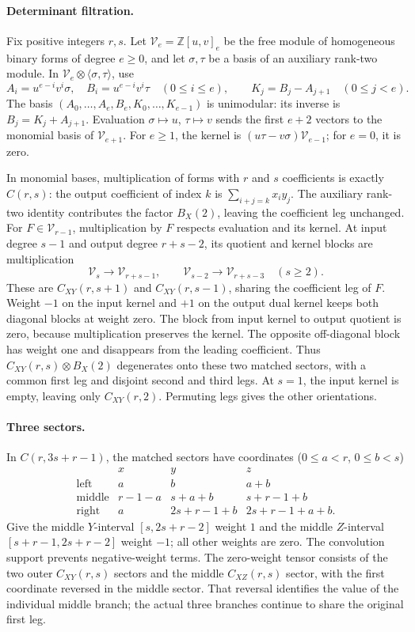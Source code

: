 \documentclass[11pt]{article}
\theoremstyle{remark}
\newcommand{\Z}{\mathbb Z}
\begin{document}
\paragraph{Determinant filtration.}
Fix positive integers $r,s$. Let $\mathcal V_e=\Z[u,v]_e$ be the free
module of homogeneous binary forms of degree $e\geq0$, and let
$\sigma,\tau$ be a basis of an auxiliary rank-two module. In
$\mathcal V_e\otimes\langle\sigma,\tau\rangle$, use
\[
 A_i=u^{e-i}v^i\sigma,\quad B_i=u^{e-i}v^i\tau
       \quad(0\leq i\leq e),\qquad
 K_j=B_j-A_{j+1}\quad(0\leq j<e).
\]
The basis $(A_0,\ldots,A_e,B_e,K_0,\ldots,K_{e-1})$ is unimodular:
its inverse is $B_j=K_j+A_{j+1}$. Evaluation
$\sigma\mapsto u$, $\tau\mapsto v$ sends the first $e+2$ vectors to
the monomial basis of $\mathcal V_{e+1}$. For $e\geq1$, the kernel is
$(u\tau-v\sigma)\mathcal V_{e-1}$; for $e=0$, it is zero.

In monomial bases, multiplication of forms with $r$ and $s$ coefficients
is exactly $C(r,s)$: the output coefficient of index $k$ is
$\sum_{i+j=k}x_i y_j$. The auxiliary rank-two identity contributes
the factor $B_X(2)$, leaving the coefficient leg unchanged.
For $F\in\mathcal V_{r-1}$, multiplication by $F$ respects evaluation
and its kernel. At input degree $s-1$ and output degree $r+s-2$,
its quotient and kernel blocks are multiplication
\[
 \mathcal V_s\longrightarrow\mathcal V_{r+s-1},\qquad
 \mathcal V_{s-2}\longrightarrow\mathcal V_{r+s-3}\quad(s\geq2).
\]
These are $C_{XY}(r,s+1)$ and $C_{XY}(r,s-1)$, sharing the
coefficient leg of $F$. Weight $-1$ on the input kernel and $+1$ on
the output dual kernel keeps both diagonal blocks at weight zero.
The block from input kernel to output quotient is zero, because
multiplication preserves the kernel. The opposite off-diagonal block
has weight one and disappears from the leading coefficient. Thus
$C_{XY}(r,s)\otimes B_X(2)$ degenerates onto these two matched
sectors, with a common first leg and disjoint second and third legs.
At $s=1$, the input kernel is empty, leaving only
$C_{XY}(r,2)$. Permuting legs gives the other orientations.

\paragraph{Three sectors.}
In $C(r,3s+r-1)$, the matched sectors have coordinates
($0\leq a<r$, $0\leq b<s$)
\[
 \begin{array}{c|ccc}
 &x&y&z\\\hline
 \text{left}&a&b&a+b\\
 \text{middle}&r-1-a&s+a+b&s+r-1+b\\
 \text{right}&a&2s+r-1+b&2s+r-1+a+b.
 \end{array}
\]
Give the middle $Y$-interval $[s,2s+r-2]$ weight $1$ and the
middle $Z$-interval $[s+r-1,2s+r-2]$ weight $-1$; all other weights
are zero. The convolution support prevents negative-weight terms.
The zero-weight tensor consists of the two outer $C_{XY}(r,s)$
sectors and the middle $C_{XZ}(r,s)$ sector, with the first
coordinate reversed in the middle sector.
That reversal identifies the value of the individual middle branch;
the actual three branches continue to share the original first leg.
\end{document}
